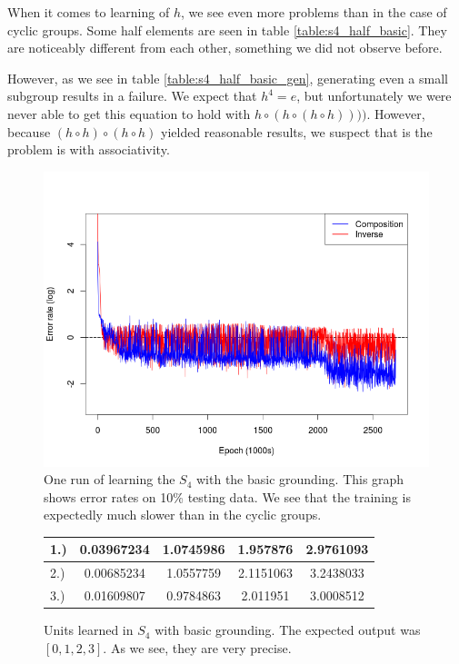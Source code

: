 When it comes to learning of $h$, we see even more problems than in the case of cyclic groups. Some half elements are seen in table \ref{table:s4_half_basic}. They are noticeably different from each other, something we did not observe before.

However, as we see in table \ref{table:s4_half_basic_gen}, generating even a small subgroup results in a failure. We expect that $h^4=e$, but unfortunately we were never able to get this equation to hold with $h\circ(h\circ(h\circ h))))$. However, because $(h\circ h)\circ (h\circ h)$ yielded reasonable results, we suspect that is the problem is with associativity.

\begin{figure}
\caption{One run of learning the $S_4$ with the basic grounding. This graph shows error rates on 10\% testing data. We see that the training is expectedly much slower than in the cyclic groups.}
\label{graph:s4_basic}
\includegraphics[width=0.9\linewidth]{../img/s4_comp+inv.png}
\end{figure}

\begin{figure}
\center
\caption{Units learned in $S_4$ with basic grounding. The expected output was $[0,1,2,3]$. As we see, they are very precise.}
\label{table:s4_unit_basic}
\begin{tabular}{l|cccc}
1.) &0.03967234 & 1.0745986 & 1.957876 & 2.9761093\\
\hline
2.) &0.00685234 & 1.0557759 & 2.1151063 & 3.2438033\\
\hline
3.) &0.01609807 & 0.9784863 & 2.011951 & 3.0008512\\
\end{tabular}
\end{figure}

